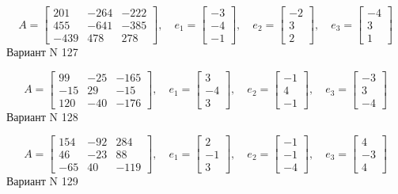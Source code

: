 \documentclass[11pt]{report}
\begin{document}
$$A = \left[\begin{matrix}201 & -264 & -222\\455 & -641 & -385\\-439 & 478 & 278\end{matrix}\right],\quad e_1 = \left[\begin{matrix}-3\\-4\\-1\end{matrix}\right],\quad e_2 = \left[\begin{matrix}-2\\3\\2\end{matrix}\right],\quad e_3 = \left[\begin{matrix}-4\\3\\1\end{matrix}\right]$$Вариант N 127

$$A = \left[\begin{matrix}99 & -25 & -165\\-15 & 29 & -15\\120 & -40 & -176\end{matrix}\right],\quad e_1 = \left[\begin{matrix}3\\-4\\3\end{matrix}\right],\quad e_2 = \left[\begin{matrix}-1\\4\\-1\end{matrix}\right],\quad e_3 = \left[\begin{matrix}-3\\3\\-4\end{matrix}\right]$$Вариант N 128

$$A = \left[\begin{matrix}154 & -92 & 284\\46 & -23 & 88\\-65 & 40 & -119\end{matrix}\right],\quad e_1 = \left[\begin{matrix}2\\-1\\3\end{matrix}\right],\quad e_2 = \left[\begin{matrix}-1\\-1\\-4\end{matrix}\right],\quad e_3 = \left[\begin{matrix}4\\-3\\4\end{matrix}\right]$$Вариант N 129
\end{document}
